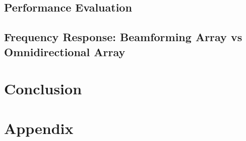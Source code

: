 	\chapter{Performance Evaluation}
		

		
	\chapter{Frequency Response: Beamforming Array vs Omnidirectional Array}
		
		


 
\part{Conclusion}\label{pt:conclusion}
% 
%

\glsresetall
\appendix %

 \graphicspath{{figures/appendix/}}
\part{Appendix}\label{pt:appendix}















